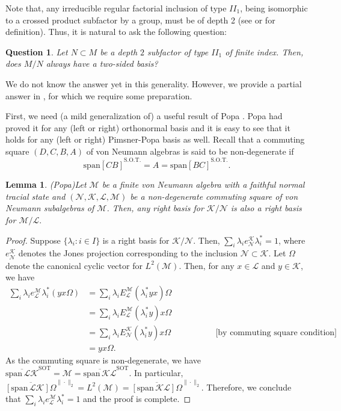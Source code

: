 \documentclass{amsart}
\newtheorem{lemma}[theorem]{Lemma}
\newtheorem{question}[theorem]{Question}
\theoremstyle{definition}
\theoremstyle{theorem}
\begin{document}
Note that, any irreducible regular factorial inclusion of type $II_1$, being
isomorphic to a crossed product subfactor by a group, must be of depth 2 (see \cite{GHJ} or 
 for definition).  Thus, it is natural to
ask the following question:

 \begin{question}
  Let $N\subset M$ be a depth $2$ subfactor of type $II_1$ of finite
  index. Then, does $M/N$ always have a two-sided basis?
 \end{question}

We do not know the answer yet in this generality. However, we provide
a partial answer in , for which we require
some preparation.

First, we need (a mild generalization of) a useful result of Popa
\cite[$\S\,$1.1.5]{pop2}. Popa had proved it for any (left or right)
orthonormal basis and it is easy to see that it holds for any (left or
right) Pimsner-Popa basis as well. Recall that a commuting square $(D,
C, B, A)$ of von Neumann algebras is said to be non-degenerate if
\[
\overline{\mathrm{span}[CB]}^{\mathrm{S.O.T.}} = A = \overline{\mathrm{span}[BC]}^{\mathrm{S.O.T.}}.
\]


\begin{lemma}(Popa)\label{popacommsqrs}
 Let $\mathcal{M}$ be a finite von Neumann algebra with a faithful
 normal tracial state and
 $(\mathcal{N},\mathcal{K},\mathcal{L},\mathcal{M})$ be a
 non-degenerate commuting square of von Neumann subalgebras of
 $\mathcal{M}$. Then, any right basis for $\mathcal{K}/\mathcal{N}$ is also a
 right basis for $\mathcal{M}/\mathcal{L}.$
\end{lemma}
\begin{proof}
 Suppose $\{\lambda_i:i\in I\}$ is a right basis for
 $\mathcal{K}/\mathcal{N}$. Then, $\sum_i\lambda_i
 e^{\mathcal{K}}_{\mathcal{N}}\lambda^*_i=1$, where
 $e^{\mathcal{K}}_{\mathcal{N}}$ denotes the Jones projection corresponding
 to the inclusion $\mathcal{N}\subset \mathcal{K}$. Let $\Omega$ denote the canonical cyclic vector for $L^2(\mathcal{M})$. Then, for any $x\in
 \mathcal{L}$ and $y\in \mathcal{K}$, we have
 \begin{align*}
 \sum_i \lambda_i e^{\mathcal{M}}_{\mathcal{L}} \lambda^*_i(yx\Omega)
 &= \sum_i \lambda_i E^{\mathcal{M}}_{\mathcal{L}}(\lambda^*_iyx)\Omega\\
 &= \sum_i \lambda_i E^{\mathcal{M}}_{\mathcal{L}}(\lambda^*_iy)x\Omega\\
 &= \sum_i \lambda_i E^{\mathcal{K}}_{\mathcal{N}}(\lambda^*_iy)x\Omega~~~~~~~~~~~~~~~\qquad \text{[by commuting square condition]}\\
 &= yx\Omega.
 \end{align*}
As the commuting square is non-degenerate, we have
$\overline{\mathrm{span}\, \mathcal{L}\mathcal{K}}^{\mathrm{SOT}}=\mathcal{M}=
\overline{\mathrm{span}\, \mathcal{K}\mathcal{L}}^{\mathrm{SOT}}$. In
particular,
$\overline{[\mathrm{span}\, \mathcal{L}\mathcal{K}] \Omega}^{\|\cdot\|_2}=
L^2(\mathcal{M})=
\overline{[\mathrm{span}\, \mathcal{K}\mathcal{L}]\Omega }^{\|\cdot\|_2}$.
Therefore, we conclude that $\sum_i
\lambda_ie^{\mathcal{M}}_{\mathcal{L}}\lambda^*_i=1$ and the proof is
complete.
\end{proof}
\end{document}
